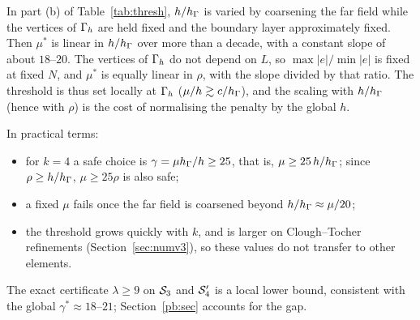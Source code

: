 In part (b) of Table~\ref{tab:thresh}, $h/h_\Gamma$ is varied by coarsening the far field while the vertices of $\Gamma_h$ are held fixed and the boundary layer approximately fixed. Then $\mu^\ast$ is linear in $h/h_\Gamma$ over more than a decade, with a constant slope of about $18$--$20$. The vertices of $\Gamma_h$ do not depend on $L$, so $\max|e|/\min|e|$ is fixed at fixed $N$, and $\mu^\ast$ is equally linear in $\rho$, with the slope divided by that ratio. The threshold is thus set locally at $\Gamma_h$ ($\mu/h\gtrsim c/h_\Gamma$), and the scaling with $h/h_\Gamma$ (hence with $\rho$) is the cost of normalising the penalty by the global $h$.

In practical terms:
\begin{itemize}
\item for $k=4$ a safe choice is $\gamma=\mu h_\Gamma/h\ge25$, that is, $\mu\ge25\,h/h_\Gamma$; since $\rho\ge h/h_\Gamma$, $\mu\ge25\rho$ is also safe;
\item a fixed $\mu$ fails once the far field is coarsened beyond $h/h_\Gamma\approx\mu/20$;
\item the threshold grows quickly with $k$, and is larger on Clough--Tocher refinements (Section~\ref{sec:numv3}), so these values do not transfer to other elements.
\end{itemize}
The exact certificate $\lambda\ge9$ on $\mathcal S_3$ and $\mathcal S_4'$ is a local lower bound, consistent with the global $\gamma^\ast\approx18$--$21$; Section~\ref{pb:sec} accounts for the gap.

